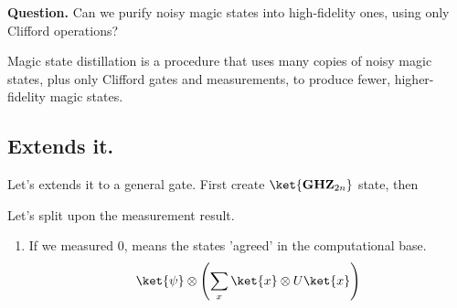 \documentclass[12pt,a4paper]{article}
\begin{document}
\textbf{Question.} Can we purify noisy magic states into high-fidelity ones, using only Clifford operations?

Magic state distillation is a procedure that uses many copies of noisy magic states, plus only Clifford gates and measurements, to produce fewer, higher-fidelity magic states.

\subsection{Extends it.}

Let's extends it to a general gate. First create $\ket{\textbf{GHZ}_{2n}}$ state, then 

Let's split upon the measurement result. 
\begin{enumerate}
    \item If we measured $0$, means the states 'agreed' in the computational base. 
      \begin{equation*}
    \begin{split}
          \ket{\psi} \otimes \left( \sum_x\ket{x}\otimes U\ket{x} \right)
    \end{split}
\end{equation*}
\end{enumerate}

\else
\fi


\printbibliography 
\end{document}
